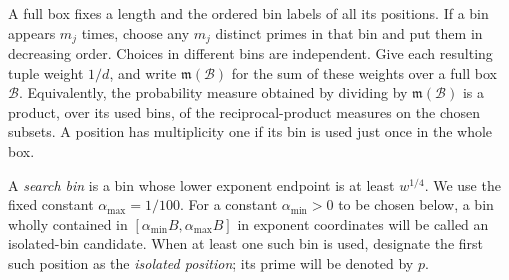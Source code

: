 A full box fixes a length and the ordered bin labels of all its
positions.  If a bin appears $m_j$ times, choose any $m_j$ distinct
primes in that bin and put them in decreasing order.  Choices in
different bins are independent.  Give each resulting tuple weight
$1/d$, and write $\mathfrak m(\mathcal B)$ for the sum of these
weights over a full box $\mathcal B$.  Equivalently, the probability
measure obtained by dividing by $\mathfrak m(\mathcal B)$ is a
product, over its used bins, of the reciprocal-product measures on
the chosen subsets.  A position has multiplicity one if its bin is
used just once in the whole box.

A \emph{search bin} is a bin whose lower exponent endpoint is at
least $w^{1/4}$.  We use the fixed constant
$\alpha_{\max}=1/100$.  For a constant $\alpha_{\min}>0$ to be chosen below, a bin wholly
contained in $[\alpha_{\min}B,\alpha_{\max}B]$ in exponent coordinates will be
called an isolated-bin candidate.  When at least one such bin is
used, designate the first such position as the \emph{isolated
position}; its prime will be denoted by $p$.

